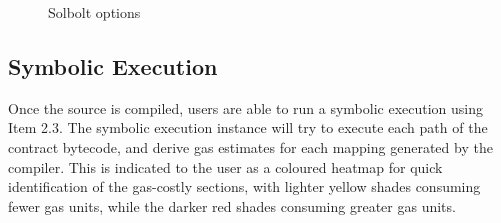 \begin{figure}[h]
  \centering
  \qquad
  \caption{Solbolt options}%
  \label{fig:solbolt_options}%
\end{figure}


\subsection{Symbolic Execution}

Once the source is compiled, users are able to run a symbolic execution using Item 2.3.
The symbolic execution instance will try to execute each path of the contract bytecode,
and derive gas estimates for each mapping generated by the compiler. This is indicated to
the user as a coloured heatmap for quick identification of the gas-costly sections, 
with lighter yellow shades consuming fewer gas units,
while the darker red shades consuming greater gas units. 


